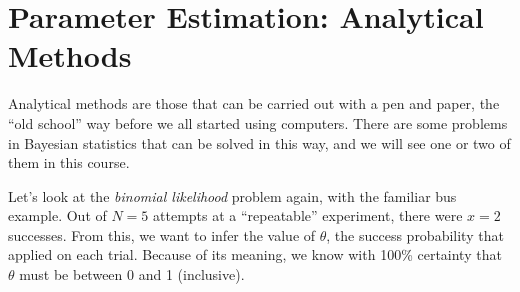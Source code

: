 \chapter{Parameter Estimation: Analytical Methods}
Analytical methods are those that can be carried out with a pen and paper,
the ``old school'' way before we all started using computers. There are some
problems in Bayesian statistics that can be solved in this way, and we will
see one or two of them in this course.

Let's look at the {\it binomial likelihood} problem again, with the familiar
bus example. Out of $N=5$ attempts at a ``repeatable'' experiment, there were
$x=2$ successes. From this, we want to infer the value of $\theta$, the
success probability that applied on each trial. Because of its meaning, we know
with 100\% certainty that $\theta$ must be between 0 and 1 (inclusive).

